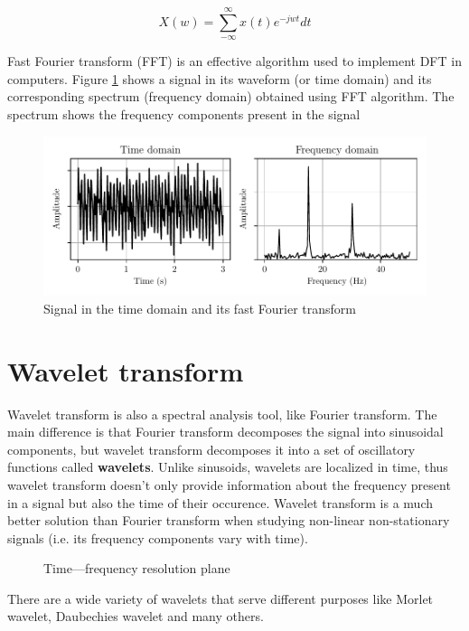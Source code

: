\begin{equation}
    X(w) = \sum_{-\infty}^{\infty}x(t)e^{-jwt}dt
    \label{equation:discrete-fourier-transform}
\end{equation}

Fast Fourier transform (FFT) is an effective algorithm used to implement DFT in computers. Figure \ref{figure:fft} shows a signal in its waveform (or time domain) and its corresponding spectrum (frequency domain) obtained using FFT algorithm. The spectrum shows the frequency components present in the signal

\begin{figure}[H]
    \centering
    \includegraphics{figures/fft.pdf}
    \caption{Signal in the time domain and its fast Fourier transform}
    \label{figure:fft}
\end{figure}

\section{Wavelet transform}
Wavelet transform is also a spectral analysis tool, like Fourier transform. The main difference is that Fourier transform decomposes the signal into sinusoidal components, but wavelet transform decomposes it into a set of oscillatory functions called \textbf{wavelets}. Unlike sinusoids, wavelets are localized in time, thus wavelet transform doesn't only provide information about the frequency present in a signal but also the time of their occurence. Wavelet transform is a much better solution than Fourier transform when studying non-linear non-stationary signals (i.e. its frequency components vary with time).

\begin{figure}[H]
    \centering
    
    \caption{Time—frequency resolution plane}
    \label{fig:time-frequency-plane}
\end{figure}

There are a wide variety of wavelets that serve different purposes like Morlet wavelet, Daubechies wavelet and many others. 

